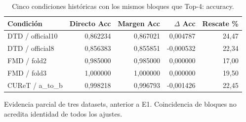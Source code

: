 \begin{table}[!htbp]\centering
\fontsize{9}{11}\selectfont\setlength{\tabcolsep}{4pt}
\caption{Cinco condiciones históricas con los mismos bloques que Top-4: accuracy.}\label{tab:tm-fixed4-margin}
\begin{tabular}{@{}lrrrr@{}}\toprule
Condición & Directo Acc & Margen Acc & $\Delta$ Acc & Rescate \%\\\midrule
DTD / official10 & 0,862234 & 0,867021 & 0,004787 & 24,47\\
DTD / official8 & 0,856383 & 0,855851 & -0,000532 & 22,34\\
FMD / fold2 & 0,985000 & 0,985000 & 0,000000 & 17,00\\
FMD / fold3 & 1,000000 & 1,000000 & 0,000000 & 19,50\\
CUReT / a\_to\_b & 0,998218 & 0,996793 & -0,001426 & 22,45\\
\bottomrule\end{tabular}
\par\smallskip\begin{minipage}{0.98\textwidth}\footnotesize Evidencia parcial de tres datasets, anterior a E1. Coincidencia de bloques no acredita identidad de todos los ajustes.\end{minipage}
\end{table}
